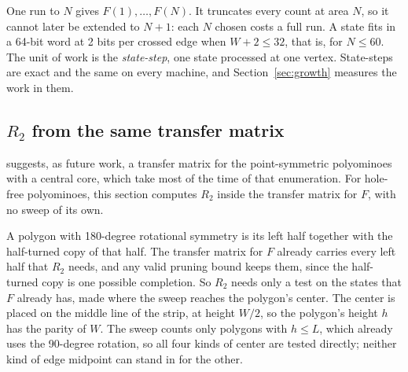 \documentclass[11pt]{a000104}
\numberwithin{equation}{section}
\begin{document}
One run to $N$ gives $F(1), \ldots, F(N)$.
It truncates every count at area $N$, so it cannot later be extended to $N + 1$: each $N$ chosen costs a full run.
A state fits in a 64-bit word at 2 bits per crossed edge when $W + 2 \le 32$, that is, for $N \le 60$.
The unit of work is the \emph{state-step}, one state processed at one vertex.
State-steps are exact and the same on every machine, and Section~\ref{sec:growth} measures the work in them.

\subsection{\texorpdfstring{$R_2$}{R2} from the same transfer matrix}\label{sec:r2}

\textcite[Sect.~6.1]{Shirakawa:2025} suggests, as future work, a transfer matrix for the point-symmetric polyominoes with a central core, which take most of the time of that enumeration.
For hole-free polyominoes, this section computes $R_2$ inside the transfer matrix for $F$, with no sweep of its own.

A polygon with 180-degree rotational symmetry is its left half together with the half-turned copy of that half.
The transfer matrix for $F$ already carries every left half that $R_2$ needs, and any valid pruning bound keeps them, since the half-turned copy is one possible completion.
So $R_2$ needs only a test on the states that $F$ already has, made where the sweep reaches the polygon's center.
The center is placed on the middle line of the strip, at height $W/2$, so the polygon's height $h$ has the parity of $W$.
The sweep counts only polygons with $h \le L$, which already uses the 90-degree rotation, so all four kinds of center are tested directly; neither kind of edge midpoint can stand in for the other.
\end{document}
